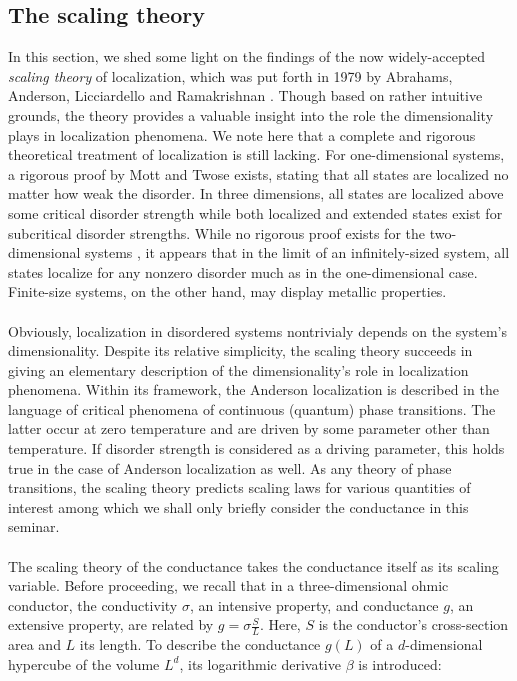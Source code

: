 \documentclass[10pt,a4paper]{article}
\begin{document}
\subsection{The scaling theory}
In this section, we shed some light on the findings of the now widely-accepted \emph{scaling theory} of localization, which was put forth in 1979 by Abrahams, Anderson, Licciardello and Ramakrishnan \cite{scaling}. Though based on rather intuitive grounds, the theory provides a valuable insight into the role the dimensionality plays in localization phenomena. We note here that a complete and rigorous theoretical treatment of localization is still lacking. 
For one-dimensional systems, a rigorous proof by Mott and Twose \cite{Mott_Twose} exists, stating that all states are localized no matter how weak the disorder. In three dimensions, all states are localized above some critical disorder strength while both localized and extended states exist for subcritical disorder strengths. While no rigorous proof exists for the two-dimensional systems \cite{Kramer}, it appears that in the limit of an infinitely-sized system, all states localize for any nonzero disorder much as in the one-dimensional case. Finite-size systems, on the other hand, may display metallic properties.  
\\\\
\noindent Obviously, localization in disordered systems nontrivialy depends on the system's dimensionality. Despite its relative simplicity, the scaling theory succeeds in giving an elementary description of the dimensionality's role in localization phenomena. Within its framework, the Anderson localization is described in the language of critical phenomena of continuous (quantum) phase transitions. The latter occur at zero temperature and are driven by some parameter other than temperature. If disorder strength is considered as a driving parameter, this holds true in the case of Anderson localization as well. As any theory of phase transitions, the scaling theory predicts scaling laws for various quantities of interest among which we shall only briefly consider the conductance in this seminar. \\\\
The scaling theory of the conductance takes the conductance itself as its scaling variable. Before proceeding, we recall that in a three-dimensional ohmic conductor, the conductivity $\sigma$, an intensive property, and conductance $g$, an extensive property, are related by $g=\sigma \frac{S}{L}$. Here, $S$ is the conductor's cross-section area and $L$ its length. To describe the conductance $g(L)$ of a $d$-dimensional hypercube of the volume $L^d$, its logarithmic derivative $\beta$ is introduced:
\end{document}
